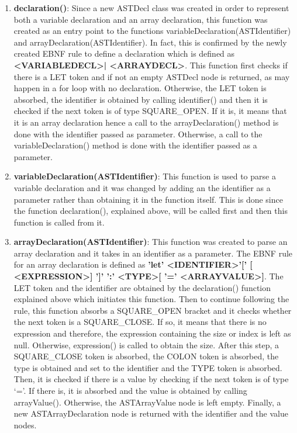 \documentclass{article}
\begin{document}
\begin{enumerate}
								\item \textbf{declaration()}: Since a new ASTDecl class was created in order to represent both a variable declaration and an array declaration, this function was created as an entry point to the functions variableDeclaration(ASTIdentifier) and arrayDeclaration(ASTIdentifier). In fact, this is confirmed by the newly created EBNF rule to define a declaration which is defined as \textbf{\textless VARIABLEDECL\textgreater | \textless ARRAYDECL\textgreater}. This function first checks if there is a LET token and if not an empty ASTDecl node is returned, as may happen in a for loop with no declaration. Otherwise, the LET token is absorbed, the identifier is obtained by calling identifier() and then it is checked if the next token is of type SQUARE\_OPEN. If it is, it means that it is an array declaration hence a call to the arrayDeclaration() method is done with the identifier passed as parameter. Otherwise, a call to the variableDeclaration() method is done with the identifier passed as a parameter.
							
				\item \textbf{variableDeclaration(ASTIdentifier)}: This function is used to parse a variable declaration and it was changed by adding an the identifier as a parameter rather than obtaining it in the function itself. This is done since the function declaration(), explained above, will be called first and then this function is called from it.
				
				\item \textbf{arrayDeclaration(ASTIdentifier)}: This function was created to parse an array declaration and it takes in an identifier as a parameter. The EBNF rule for an array declaration is defined as \textbf{'let' \textless IDENTIFIER\textgreater '[' [ \textless EXPRESSION\textgreater ] ']' ':' \textless TYPE\textgreater [ '=' \textless ARRAYVALUE\textgreater ]}. The LET token and the identifier are obtained by the declaration() function explained above which initiates this function. Then to continue following the rule, this function absorbs a SQUARE\_OPEN bracket and it checks whether the next token is a SQUARE\_CLOSE. If so, it means that there is no expression and therefore, the expression containing the size or index is left as null. Otherwise, expression() is called to obtain the size. After this step, a SQUARE\_CLOSE token is absorbed, the COLON token is absorbed, the type is obtained and set to the identifier and the TYPE token is absorbed. Then, it is checked if there is a value by checking if the next token is of type `='. If there is, it is absorbed and the value is obtained by calling arrayValue(). Otherwise, the ASTArrayValue node is left empty. Finally, a new ASTArrayDeclaration node is returned with the identifier and the value nodes.
				

\end{enumerate}
\end{document}
